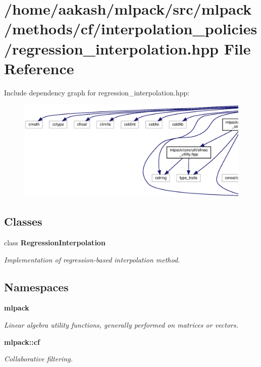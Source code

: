 \section{/home/aakash/mlpack/src/mlpack/methods/cf/interpolation\+\_\+policies/regression\+\_\+interpolation.hpp File Reference}
\label{regression__interpolation_8hpp}
Include dependency graph for regression\+\_\+interpolation.\+hpp\+:
\nopagebreak
\begin{figure}[H]
\begin{center}
\leavevmode
\includegraphics[width=350pt]{regression__interpolation_8hpp__incl}
\end{center}
\end{figure}
\subsection*{Classes}
\begin{DoxyCompactItemize}
\item 
class \textbf{ Regression\+Interpolation}
\begin{DoxyCompactList}\small\item\em Implementation of regression-\/based interpolation method. \end{DoxyCompactList}\end{DoxyCompactItemize}
\subsection*{Namespaces}
\begin{DoxyCompactItemize}
\item 
 \textbf{ mlpack}
\begin{DoxyCompactList}\small\item\em Linear algebra utility functions, generally performed on matrices or vectors. \end{DoxyCompactList}\item 
 \textbf{ mlpack\+::cf}
\begin{DoxyCompactList}\small\item\em Collaborative filtering. \end{DoxyCompactList}\end{DoxyCompactItemize}


